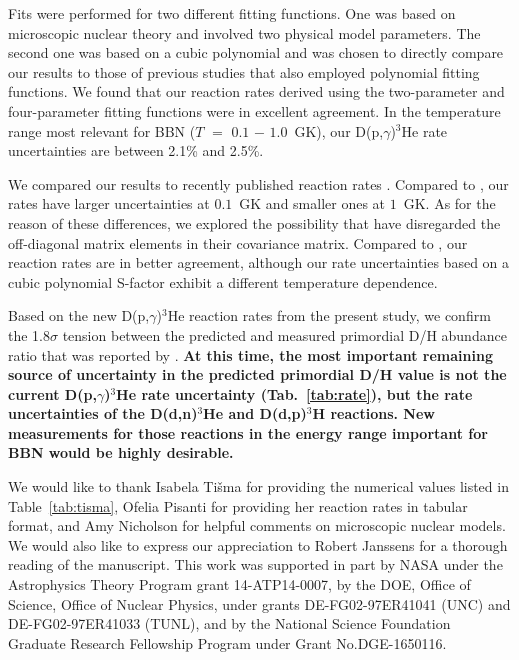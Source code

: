 \documentclass[twocolumn]{aastex63}
\begin{document}
Fits were performed for two different fitting functions. One was based on microscopic nuclear theory and involved two physical model parameters. The second one was based on a cubic polynomial and was chosen to directly compare our results to those of previous studies that also employed polynomial fitting functions. We found that our reaction rates derived using the two-parameter and four-parameter fitting functions were in excellent agreement. In the temperature range most relevant for BBN ($T$ $=$ $0.1$ $-$ $1.0$~GK), our D(p,$\gamma$)$^3$He rate uncertainties are between 2.1\% and 2.5\%.

We compared our results to recently published reaction rates \citep{Mossa20,Pis21}. Compared to \citet{Mossa20}, our rates have larger uncertainties at $0.1$~GK and smaller ones at $1$~GK. As for the reason of these differences, we explored the possibility that \citet{Mossa20} have disregarded the off-diagonal matrix elements in their covariance matrix. Compared to \citet{Pis21}, our reaction rates are in better agreement, although our rate uncertainties based on a cubic polynomial S-factor exhibit a different temperature dependence.

Based on the new D(p,$\gamma$)$^3$He reaction rates from the present study, we confirm the 1.8$\sigma$ tension between the predicted and measured primordial D/H abundance ratio that was reported by \cite{Pit21,PitNat21}. {\bf At this time, the most important remaining source of uncertainty in the predicted primordial D/H value is not the current D(p,$\gamma$)$^3$He rate uncertainty (Tab.~\ref{tab:rate}), but the rate uncertainties of the D(d,n)$^3$He and D(d,p)$^3$H reactions. New measurements for those reactions in the energy range important for BBN would be highly desirable.}


\acknowledgments
We would like to thank Isabela Ti{\v s}ma for providing the numerical values listed in Table~\ref{tab:tisma}, Ofelia Pisanti for providing her reaction rates in tabular format, and Amy Nicholson for helpful comments on microscopic nuclear models. We would also like to express our appreciation to Robert Janssens for a thorough reading of the manuscript. This work was supported in part by NASA under the Astrophysics Theory Program grant 14-ATP14-0007, by the DOE, Office of Science, Office of Nuclear Physics, under grants DE-FG02-97ER41041 (UNC) and DE-FG02-97ER41033 (TUNL), and by the National Science Foundation Graduate Research Fellowship Program under Grant No.DGE-1650116. 
\end{document}
